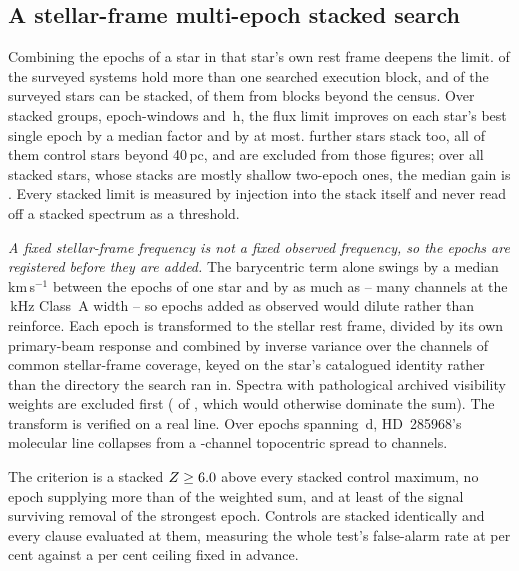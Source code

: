 \subsection{A stellar-frame multi-epoch stacked search}
\label{sec:stack}

Combining the epochs of a star in that star's own rest frame deepens the
limit. \EpMulti{} of the \NSystems{} surveyed systems hold more than one
searched execution block, and \SxStkStarCensus{} of the surveyed stars can be
stacked, \SttNStkOneEb{} of them from blocks beyond the census. Over \SyStkNGroup{} stacked groups, \SyStkNEpochComb{} epoch-windows and
\SyStkHours\,h, the flux limit improves on each star's best single epoch by a
median factor \SyStkGainMed{} and by \SyStkGainMax{} at most.
\SxStkStarOutside{} further stars stack too, all of them control stars beyond
40\,pc, and are excluded from those figures; over all \StkNStar{} stacked
stars, whose stacks are mostly shallow two-epoch ones, the median gain is
\StkLimitGainMed. Every
stacked limit is measured by injection into the stack itself and never read
off a stacked spectrum as a threshold.

\emph{A fixed stellar-frame frequency is not a fixed observed frequency, so
the epochs are registered before they are added.} The barycentric term alone
swings by a median \StkVcorrSwingMed\,km\,s$^{-1}$ between the epochs of one
star and by as much as \StkVcorrSwingMax{} -- many channels at the
\StkRefChanKHz\,kHz Class~A width -- so epochs added as observed would dilute
rather than reinforce. Each epoch is transformed to the stellar rest frame,
divided by its own primary-beam response and combined by inverse variance
over the channels of common stellar-frame coverage, keyed on the star's
catalogued identity rather than the directory the search ran in. Spectra with
pathological archived visibility weights are excluded first
(\StkBadWeight{} of \StkNProd, which would otherwise dominate the sum). The transform is verified on a real line. Over \StkRegNEpoch{} epochs
spanning \StkRegSpanD\,d, HD~285968's molecular line collapses from a
\StkRegTopoChan-channel topocentric spread to \StkRegStellarChan{}
channels.

The criterion is a stacked
$Z\ge6.0$ above every stacked control maximum, no epoch supplying more
than \StkDomMax{} of the weighted sum, and at least \StkJkMin{} of the signal
surviving removal of the strongest epoch. Controls are stacked identically
and every clause evaluated at them, measuring the whole test's
false-alarm rate at \StkCtrlFap{} per cent against a \StkFapCeil{} per cent
ceiling fixed in advance.


